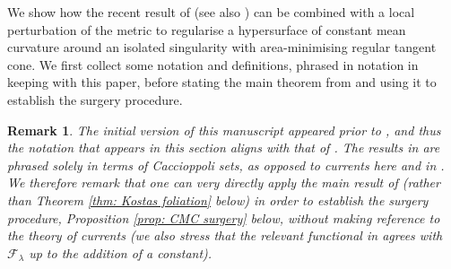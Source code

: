\documentclass[11pt]{article}
\newtheorem{rem}{Remark}
\begin{document}
We show how the recent result of \cite{Kostas23} (see also \cite{BL24}) can be combined with a local perturbation of the metric to regularise a hypersurface of constant mean curvature around an isolated singularity with area-minimising regular tangent cone. We first collect some notation and definitions, phrased in notation in keeping with this paper, before stating the  main theorem from \cite{Kostas23} and using it to establish the surgery procedure.

\begin{rem}
    The initial version of this manuscript appeared prior to \cite{BL24}, and thus the notation that appears in this section aligns with that of \cite{Kostas23}. The results in \cite{BL24} are phrased solely in terms of Caccioppoli sets, as opposed to currents here and in \cite{Kostas23}. We therefore remark that one can very directly apply the main result of \cite{BL24} (rather than Theorem \ref{thm: Kostas foliation} below) in order to establish the surgery procedure, Proposition \ref{prop: CMC surgery} below, without making reference to the theory of currents (we also stress that the relevant functional in \cite{BL24} agrees with $\mathcal{F}_\lambda$ up to the addition of a constant).
\end{rem}
\end{document}
